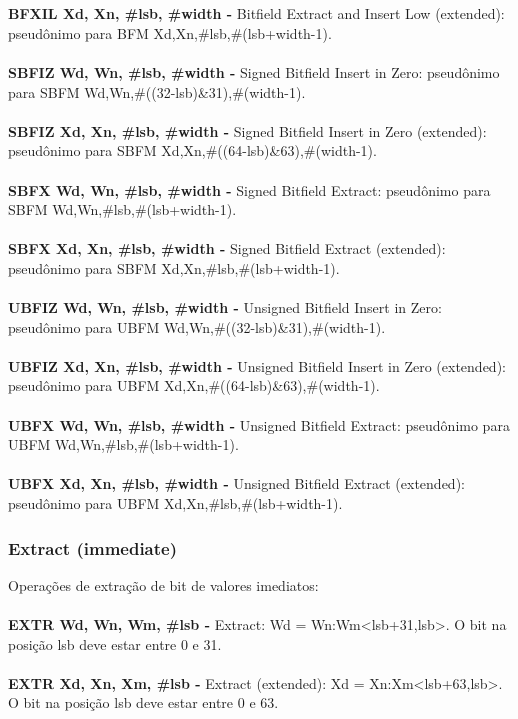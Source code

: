 \documentclass[12pt,a4paper,utf8]{ppgsi}
\begin{document}
\\\\\textbf{BFXIL Xd, Xn, \#lsb, \#width -} Bitfield Extract and Insert Low (extended): pseudônimo para BFM Xd,Xn,\#lsb,\#(lsb+width-1).
\\\\\textbf{SBFIZ Wd, Wn, \#lsb, \#width -} Signed Bitfield Insert in Zero: pseudônimo para SBFM Wd,Wn,\#((32-lsb)\&31),\#(width-1).
\\\\\textbf{SBFIZ Xd, Xn, \#lsb, \#width -} Signed Bitfield Insert in Zero (extended): pseudônimo para SBFM Xd,Xn,\#((64-lsb)\&63),\#(width-1).
\\\\\textbf{SBFX Wd, Wn, \#lsb, \#width -} Signed Bitfield Extract: pseudônimo para SBFM Wd,Wn,\#lsb,\#(lsb+width-1).
\\\\\textbf{SBFX Xd, Xn, \#lsb, \#width -} Signed Bitfield Extract (extended): pseudônimo para SBFM Xd,Xn,\#lsb,\#(lsb+width-1).
\\\\\textbf{UBFIZ Wd, Wn, \#lsb, \#width -} Unsigned Bitfield Insert in Zero: pseudônimo para UBFM Wd,Wn,\#((32-lsb)\&31),\#(width-1).
\\\\\textbf{UBFIZ Xd, Xn, \#lsb, \#width -} Unsigned Bitfield Insert in Zero (extended): pseudônimo para UBFM Xd,Xn,\#((64-lsb)\&63),\#(width-1).
\\\\\textbf{UBFX Wd, Wn, \#lsb, \#width -} Unsigned Bitfield Extract: pseudônimo para UBFM Wd,Wn,\#lsb,\#(lsb+width-1).
\\\\\textbf{UBFX Xd, Xn, \#lsb, \#width -} Unsigned Bitfield Extract (extended): pseudônimo para UBFM Xd,Xn,\#lsb,\#(lsb+width-1).


\subsubsection{Extract (immediate)}
Operações de extração de bit de valores imediatos:
\\\\\textbf{EXTR Wd, Wn, Wm, \#lsb -} Extract: Wd = Wn:Wm<lsb+31,lsb>. O bit na posição lsb deve estar entre 0 e 31.
\\\\\textbf{EXTR Xd, Xn, Xm, \#lsb -} Extract (extended): Xd = Xn:Xm<lsb+63,lsb>. O bit na posição lsb deve estar entre 0 e 63.
\end{document}
